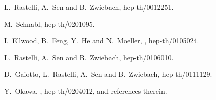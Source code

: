 \documentclass[a4paper,seceq,preprint]{ptptex}
\begin{document}
\begin{thebibliography}{99}
L.~Rastelli, A.~Sen and B.~Zwiebach,
hep-th/0012251.

M.~Schnabl,
hep-th/0201095.

I.~Ellwood, B.~Feng, Y.~He and N.~Moeller,
, hep-th/0105024.

L.~Rastelli, A.~Sen and B.~Zwiebach,
hep-th/0106010.

D.~Gaiotto, L.~Rastelli, A.~Sen and B.~Zwiebach,
hep-th/0111129.

Y.~Okawa,
, hep-th/0204012,
and references therein.
\end{thebibliography}
\end{document}
